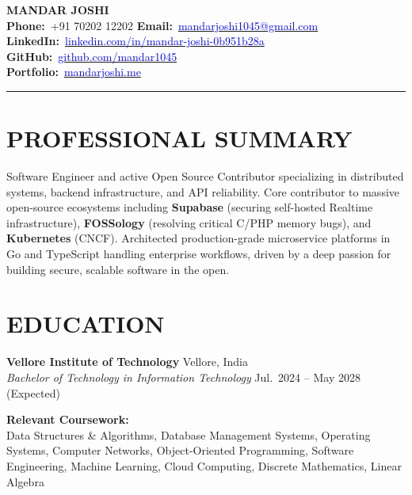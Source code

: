 \documentclass[letterpaper,10pt]{article}
\begin{document}
\begin{center}
  {\Huge \textbf{MANDAR JOSHI}} \\[6pt]
  {\normalsize
  \textbf{Phone:}\ +91 70202 12202 \enspace\textbar{}\enspace
  \textbf{Email:}\ \href{mailto:mandarjoshi1045@gmail.com}{\textcolor{blue}{mandarjoshi1045@gmail.com}} \\[4pt]
  \textbf{LinkedIn:}\ \href{https://linkedin.com/in/mandar-joshi-0b951b28a}{\textcolor{blue}{linkedin.com/in/mandar-joshi-0b951b28a}}
  \enspace\textbar{}\enspace
  \textbf{GitHub:}\ \href{https://github.com/mandar1045}{\textcolor{blue}{github.com/mandar1045}} \\[4pt]
  \textbf{Portfolio:}\ \href{https://mandarjoshi.me}{\textcolor{blue}{mandarjoshi.me}}
  }
\end{center}

\vspace{-2pt}
\noindent\rule{\textwidth}{0.5pt}
\vspace{2pt}


\section{PROFESSIONAL SUMMARY}

\noindent
Software Engineer and active Open Source Contributor specializing in distributed systems, backend infrastructure, and API reliability. Core contributor to massive open-source ecosystems including \textbf{Supabase} (securing self-hosted Realtime infrastructure), \textbf{FOSSology} (resolving critical C/PHP memory bugs), and \textbf{Kubernetes} (CNCF). Architected production-grade microservice platforms in Go and TypeScript handling enterprise workflows, driven by a deep passion for building secure, scalable software in the open.

\section{EDUCATION}

\noindent
\textbf{Vellore Institute of Technology} \hfill Vellore, India \\
\textit{Bachelor of Technology in Information Technology} \hfill Jul.\ 2024 -- May 2028 (Expected)

\vspace{4pt}
\noindent
\textbf{Relevant Coursework:} \\
Data Structures \& Algorithms, Database Management Systems, Operating Systems, Computer Networks, Object-Oriented Programming, Software Engineering, Machine Learning, Cloud Computing, Discrete Mathematics, Linear Algebra
\end{document}
